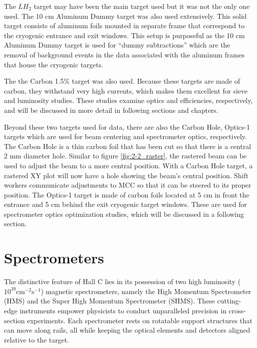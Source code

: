 \documentclass[
]{report}
\begin{document}
The \(LH_2\) target may have been the main target used but it was not
the only one used. The 10 cm Aluminum Dummy target was also used
extensively. This solid target consists of aluminum foils mounted in
separate frame that correspond to the cryogenic entrance and exit
windows. This setup is purposeful as the 10 cm Aluminum Dummy target is
used for ``dummy subtractions'' which are the removal of background
events in the data associated with the aluminum frames that house the
cryogenic targets.

The the Carbon 1.5\% target was also used. Because these targets are
made of carbon, they withstand very high currents, which makes them
excellent for sieve and luminosity studies. These studies examine optics
and efficiencies, respectively, and will be discussed in more detail in
following sections and chapters.

Beyond these two targets used for data, there are also the Carbon Hole,
Optics-1 targets which are used for beam centering and spectrometer
optics, respectively. The Carbon Hole is a thin carbon foil that has
been cut so that there is a central 2 mm diameter hole. Similar to
figure \ref{fig:2-2_raster}, the rastered beam can be used to adjust the
beam to a more central position. With a Carbon Hole target, a rastered
XY plot will now have a hole showing the beam's central position. Shift
workers communicate adjustments to MCC so that it can be steered to its
proper position. The Optics-1 target is made of carbon foils located at
5 cm in front the entrance and 5 cm behind the exit cryogenic target
windows. These are used for spectrometer optics optimization studies,
which will be discussed in a following section.

\hypertarget{Section-4.4}{%
\section{Spectrometers}\label{Section-4.4}}

The distinctive feature of Hall C lies in its possession of two high
luminosity (\(10^{39}\text{cm}^{-2}\text{s}^{-1}\)) magnetic
spectrometers, namely the High Momentum Spectrometer (HMS) and the Super
High Momentum Spectrometer (SHMS). These cutting-edge instruments
empower physicists to conduct unparalleled precision in cross-section
experiments. Each spectrometer rests on rotatable support structures
that can move along rails, all while keeping the optical elements and
detectors aligned relative to the target.


\end{document}
